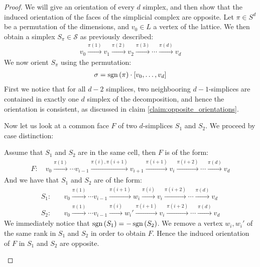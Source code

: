 \begin{proof}
    We will give an orientation of every $d$ simplex, and then show that the induced orientation of the faces of the simplicial complex are opposite.
    Let $\pi \in S^d$ be a permutation of the dimensions, and $v_0 \in L$ a vertex of the lattice. We then obtain a simplex $S_{\pi} \in \mathcal{S}$ as previously described:
    \begin{align*}
        v_0 \xrightarrow{\pi(1)} v_1 \xrightarrow{\pi(2)} v_2 \xrightarrow{\pi(3)} \cdots \xrightarrow{\pi(d)} v_d
    \end{align*}
    We now orient $S_{\pi}$ using the permutation:
    \begin{align*}
        \sigma = \operatorname{sgn}\left(\pi\right) \cdot [v_0, \dots, v_d]
    \end{align*}
    First we notice that for all $d-2$ simplices, two neighbooring $d-1$-simplices are contained  in exactly one $d$ simplex of the decomposition, and hence the orientation is consistent, as discussed in claim \ref{claim:opposite_orientations}. \par
    Now let us look at a common face $F$ of two $d$-simplices $S_1$ and $S_2$. We proceed by case distinction:
    \begin{case}{1}
        Assume that $S_1$ and $S_2$ are in the same cell, then $F$ is of the form:
        \begin{align*}
            F: \quad v_0 \xrightarrow{\pi(1)}  \cdots v_{i-1} \xrightarrow{\pi(i), \pi(i+1)} v_{i+1} \xrightarrow{\pi(i+1)} v_{i} \xrightarrow{\pi(i+2)} \cdots \xrightarrow{\pi(d)} v_d
        \end{align*}
        And we have that $S_1$ and $S_2$ are of the form:
        \begin{align*}
            S_1: \quad & v_0 \xrightarrow{\pi(1)} \cdots v_{i-1} \xrightarrow{\pi(i+1)} w_i \xrightarrow{\pi(i)} v_{i} \xrightarrow{\pi(i+2)} \cdots \xrightarrow{\pi(d)} v_d  \\
            S_2: \quad & v_0 \xrightarrow{\pi(1)} \cdots v_{i-1} \xrightarrow{\pi(i)} w_i' \xrightarrow{\pi(i+1)} v_{i} \xrightarrow{\pi(i+2)} \cdots \xrightarrow{\pi(d)} v_d
        \end{align*}
        We immediately notice that $\operatorname{sgn}\left(S_1\right) = - \operatorname{sgn}\left(S_2\right)$. We remove a vertex $w_i, w_i'$ of the same rank in $S_1$ and $S_2$ in order to obtain $F$. Hence the induced orientation of $F$ in $S_1$ and $S_2$ are opposite.
    \end{case}

\end{proof}
